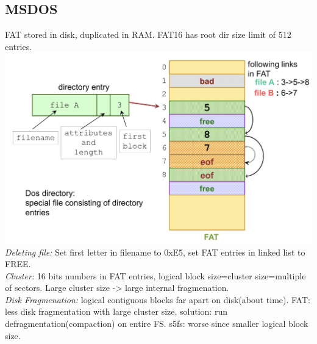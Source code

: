 \subsection*{MSDOS}
FAT stored in disk, duplicated in RAM. FAT16 has root dir size limit of 512 entries.\\
\includegraphics[width=0.9\linewidth]{images/msdos-fat}\\
\emph{Deleting file:} Set first letter in filename to 0xE5, set FAT entries in linked list to FREE.\\
\emph{Cluster:} 16 bits numbers in FAT entries, logical block size=cluster size=multiple of sectors. Large cluster size -> large internal fragmenation.\\
\emph{Disk Fragmenation:} logical contiguous blocks far apart on disk(about time). FAT: less disk fragmentation with large cluster size, solution: run defragmentation(compaction) on entire FS. s5fs: worse since smaller logical block size.

